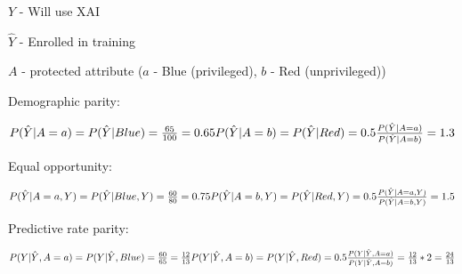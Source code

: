$Y$ - Will use XAI

$\hat{Y}$ - Enrolled in training

$A$ - protected attribute ($a$ - Blue (privileged), $b$ - Red (unprivileged))

Demographic parity:

$P(\hat{Y} | A=a) = P(\hat{Y} | Blue) = \frac{65}{100} = 0.65 \\
P(\hat{Y} | A=b) = P(\hat{Y} | Red) = 0.5 \\
\frac{P(\hat{Y} | A=a)}{P(\hat{Y} | A=b)} = 1.3$

Equal opportunity:

$ P(\hat{Y} | A=a, Y) = P(\hat{Y} | Blue, Y) = \frac{60}{80} = 0.75 \\
P(\hat{Y} | A=b, Y) = P(\hat{Y} | Red, Y) = 0.5 \\
\frac{P(\hat{Y} | A=a, Y)}{P(\hat{Y} | A=b, Y)} = 1.5$

Predictive rate parity:

$P(Y | \hat{Y}, A=a) = P(Y | \hat{Y}, Blue) = \frac{60}{65} = \frac{12}{13} \\
P(Y | \hat{Y}, A=b) = P(Y | \hat{Y}, Red) = 0.5 \\
\frac{P(Y | \hat{Y}, A=a)}{P(Y | \hat{Y}, A=b)} = \frac{12}{13} * 2 = \frac{24}{13}$